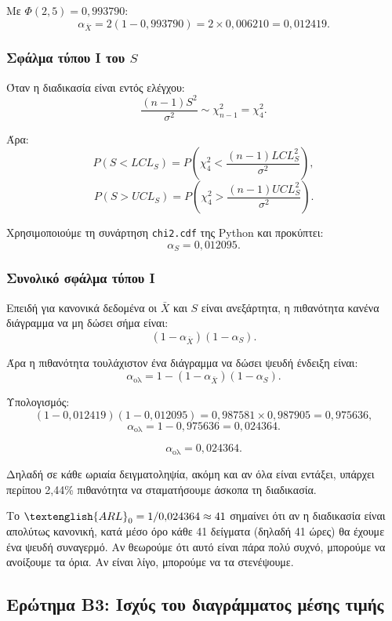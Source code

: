 \documentclass[12pt,a4paper]{article}
\newcommand{\code}[1]{\texttt{\textenglish{#1}}}
\newcommand{\ARL}{\textenglish{ARL}}
\begin{document}
Με \(\Phi(2{,}5)=0{,}993790\):
\[
    \alpha_{\bar X}=2(1-0{,}993790)=2\times 0{,}006210=0{,}012419.
\]

\subsubsection*{Σφάλμα τύπου Ι του \(S\)}

Όταν η διαδικασία είναι εντός ελέγχου:
\[
    \frac{(n-1)S^2}{\sigma^2}\sim\chi^2_{n-1}=\chi^2_4.
\]

Άρα:
\[
    P(S<LCL_S)=P\!\left(\chi^2_4<\frac{(n-1)LCL_S^2}{\sigma^2}\right),
\]
\[
    P(S>UCL_S)=P\!\left(\chi^2_4>\frac{(n-1)UCL_S^2}{\sigma^2}\right).
\]

Χρησιμοποιούμε τη συνάρτηση \code{chi2.cdf} της Python και προκύπτει:
\[
    \alpha_S=0{,}012095.
\]

\subsubsection*{Συνολικό σφάλμα τύπου Ι}

Επειδή για κανονικά δεδομένα οι \(\bar X\) και \(S\) είναι ανεξάρτητα, η
πιθανότητα κανένα διάγραμμα να μη δώσει σήμα είναι:
\[
    (1-\alpha_{\bar X})(1-\alpha_S).
\]

Άρα η πιθανότητα τουλάχιστον ένα διάγραμμα να δώσει ψευδή ένδειξη είναι:
\[
    \alpha_{\text{ολ}}=1-(1-\alpha_{\bar X})(1-\alpha_S).
\]

Υπολογισμός:
\[
    (1-0{,}012419)(1-0{,}012095)=0{,}987581\times 0{,}987905=0{,}975636,
\]
\[
    \alpha_{\text{ολ}}=1-0{,}975636=0{,}024364.
\]

\[
    \boxed{\alpha_{\text{ολ}}=0{,}024364}.
\]

Δηλαδή σε κάθε ωριαία δειγματοληψία, ακόμη και αν όλα είναι εντάξει, υπάρχει
περίπου 2,44\% πιθανότητα να σταματήσουμε άσκοπα τη διαδικασία.

\begin{intuition}
Το \(\ARL_0=1/0{,}024364\approx 41\) σημαίνει ότι αν η διαδικασία είναι
απολύτως κανονική, κατά μέσο όρο κάθε 41 δείγματα (δηλαδή 41 ώρες) θα
έχουμε ένα ψευδή συναγερμό. Αν θεωρούμε ότι αυτό είναι πάρα πολύ συχνό,
μπορούμε να ανοίξουμε τα όρια. Αν είναι λίγο, μπορούμε να τα στενέψουμε.
\end{intuition}

\subsection{Ερώτημα Β3: Ισχύς του διαγράμματος μέσης τιμής}
\end{document}
